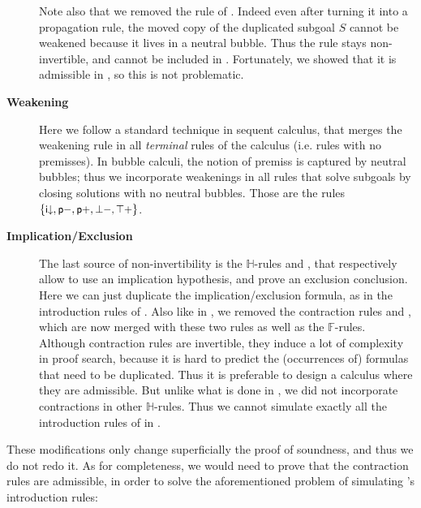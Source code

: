 \begin{description}
  Note also that we removed the  rule of .
  Indeed even after turning it into a propagation rule, the moved copy of the
  duplicated subgoal $S$ cannot be weakened because it lives in a neutral
  bubble. Thus the rule stays non-invertible, and cannot be included in
  . Fortunately, we showed that it is admissible in
  , so this is not problematic.
  
  \item[\textbf{Weakening}]
  Here we follow a standard technique in sequent calculus, that merges the
  weakening rule in all \emph{terminal} rules of the calculus (i.e. rules with
  no premisses). In bubble calculi, the notion of premiss is captured by neutral
  bubbles; thus we incorporate weakenings in all rules that solve subgoals by
  closing solutions with no neutral bubbles. Those are the rules
  $\{\text{\small$\mathsf{i{\downarrow}}$},\text{\small$\mathsf{p{-}}$},\text{\small$\mathsf{p{+}}$},\text{\small$\mathsf{\bot{-},\text{\small$\mathsf{\top{+}}$}}$}\}$.

  \item[\textbf{Implication/Exclusion}]
  The last source of non-invertibility is the $\mathbb{H}$-rules
  \rsf{{\limp}{-}} and \rsf{{\lsub}{+}}, that respectively allow to use an
  implication hypothesis, and prove an exclusion conclusion. Here we can just
  duplicate the implication/exclusion formula, as in the introduction rules of
  . Also like in , we removed the contraction rules
   and , which are now merged with these two rules as well
  as the $\mathbb{F}$-rules. Although contraction rules are invertible, they
  induce a lot of complexity in proof search, because it is hard to predict the
  (occurrences of) formulas that need to be duplicated. Thus it is preferable to
  design a calculus where they are admissible. But unlike what is done in
  , we did not incorporate contractions in other $\mathbb{H}$-rules.
  Thus we cannot simulate exactly all the introduction rules of  in
  .

\end{description}

These modifications only change superficially the proof of soundness, and thus
we do not redo it. As for completeness, we would need to prove that the
contraction rules are admissible, in order to solve the aforementioned problem
of simulating 's introduction rules:

